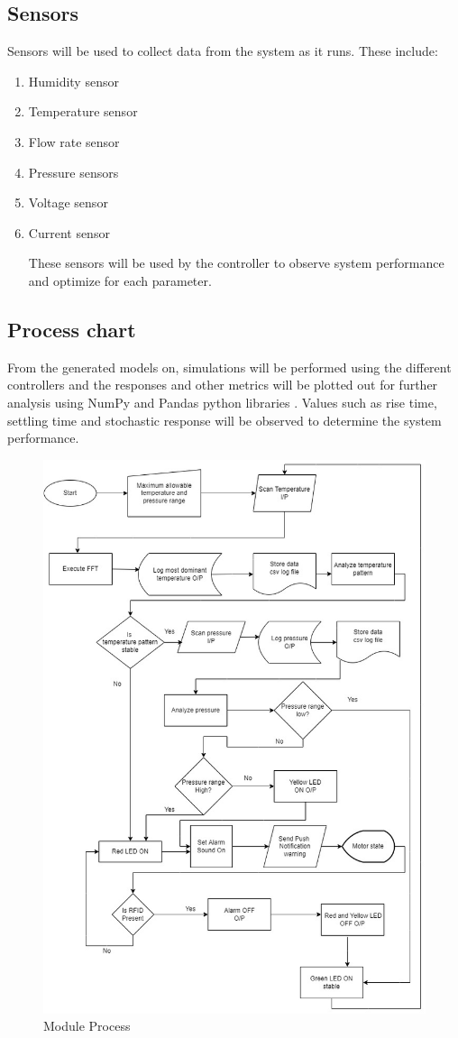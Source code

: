 \subsection{ Sensors}
Sensors will be used to collect data from the system as it runs. These include:
\begin{enumerate}
	\item Humidity sensor
	\item Temperature sensor
	\item Flow rate sensor
	\item Pressure sensors
	\item Voltage sensor
	\item Current sensor
	
	These sensors will be used by the controller to observe system performance and optimize for each parameter.
\end{enumerate}

\subsection{ Process chart}
From the generated models on, simulations will be performed using the different
controllers and the responses and other metrics will be plotted out for further analysis using NumPy and Pandas python libraries .
Values such as rise time, settling time and stochastic response will be observed to determine the system performance.
\begin{figure}
	\centering
	\includegraphics[width=0.7\linewidth]{Figures/model1}
	\caption{Module Process}
	\label{fig:model1}
\end{figure}



